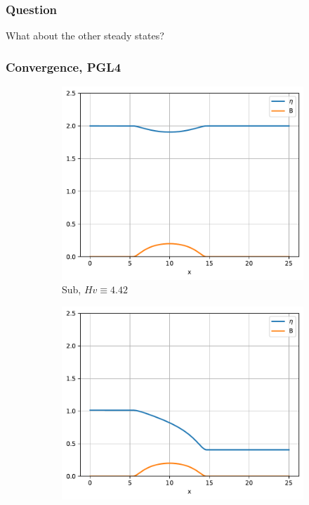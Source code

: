 \documentclass[pt12]{beamer}
\begin{document}
\begin{frame}
\frametitle{Question}
\centering


What about the other steady states?


\end{frame}




\begin{frame}[label=NumericalResultsWithoutWBmonodimensionalcasesSW]
\frametitle{Convergence, PGL4}

\begin{figure}
     \centering
     \begin{subfigure}[b]{0.30\textwidth}
         \centering
         \includegraphics[width=\textwidth]{sub.pdf}
         \caption{Sub, $Hv\equiv 4.42$}
         \label{convergence_comp_jumps_sub}
     \end{subfigure}
     \begin{subfigure}[b]{0.30\textwidth}
         \centering
         \includegraphics[width=\textwidth]{trans.pdf}

\end{subfigure}
\end{figure}
\end{frame}
\end{document}
